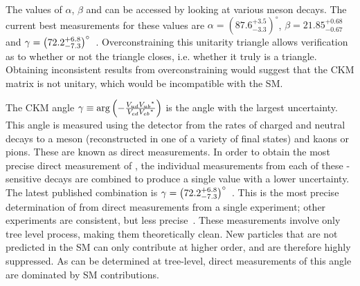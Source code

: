 The values of $\alpha$, $\beta$ and \Pgamma can be accessed by looking at various \B meson decays. The current best measurements for these values are $\alpha = \left(87.6^{+3.5}_{-3.3}\right)^{\circ}$, $\beta = 21.85^{+0.68}_{-0.67}$ and $\gamma = \left(72.2^{+6.8}_{-7.3}\right)^{\circ}$~\cite{PDG2016,LHCb-PAPER-2016-032}. Overconstraining this unitarity triangle allows verification as to whether or not the triangle closes, i.e. whether it truly is a triangle. Obtaining inconsistent results from overconstraining would suggest that the CKM matrix is not unitary, which would be incompatible with the SM. 

The CKM angle $\gamma \equiv \arg\left(-\frac{{V_{{u}{d}}}{{V_{{u}{b}}}}^*}{{V_{{c}{d}}}{{V_{{c}{b}}}}^*}\right)$ is the angle with the largest uncertainty. This angle is measured using the \lhcb detector from the rates of charged and neutral \B decays to a \D meson (reconstructed in one of a variety of final states) and kaons or pions. These are known as direct measurements. In order to obtain the most precise direct measurement of \Pgamma, the individual measurements from each of these \Pgamma-sensitive decays are combined to produce a single value with a lower uncertainty. The latest published \lhcb combination is $\gamma = \left(72.2^{+6.8}_{-7.3}\right)^{\circ}$~\cite{LHCb-PAPER-2016-032}. This is the most precise determination of \Pgamma from direct measurements from a single experiment; other experiments are consistent, but less precise~\cite{Babar_gamma,Belle_gamma}. These measurements involve only tree level process, making them theoretically clean. New particles that are not predicted in the SM can only contribute at higher order, and are therefore highly suppressed. As \Pgamma can be determined at tree-level, direct measurements of this angle are dominated by SM contributions.

